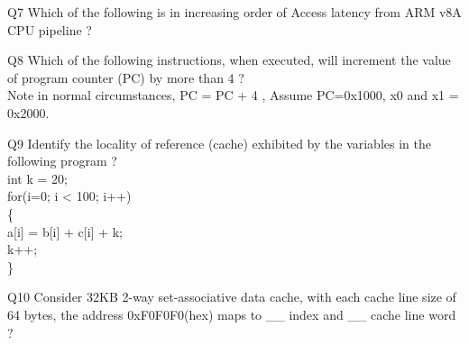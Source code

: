 \documentclass[a4paper]{article}
\begin{document}
{\begin{question}{Q7}   
   Which of the following is in increasing order of Access latency from ARM v8A CPU pipeline ? 
  \begin{choices}
  \end{choices}
\end{question}


\begin{question}{Q8}   
    Which of the following instructions, when executed, will increment the value of program counter (PC)  by more than 4 ? \\ Note in normal circumstances, PC = PC + 4 , Assume PC=0x1000, x0 and x1 = 0x2000.
  \begin{choices}
  \end{choices}
\end{question}

\begin{question}{Q9}   
   Identify the locality of reference (cache) exhibited by the variables in the following program ? \\
   int k = 20;  \\
   for(i=0; i < 100; i++) \\
   \{ \\
 	\hspace*{5 mm}        a[i] = b[i] + c[i] + k; \\
   	\hspace*{5 mm}     k++;\\
   \} \\
   
  \begin{choices}
  \end{choices}
\end{question}

\begin{question}{Q10}   
   Consider  32KB 2-way set-associative data cache, with each cache line size of 64 bytes, the address 0xF0F0F0(hex)  maps to  \_\_ index  and \_\_ cache line word ? 
  \begin{choices}
  \end{choices}
\end{question}

}
\end{document}
